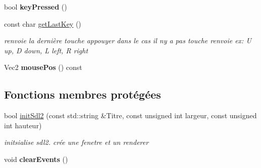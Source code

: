 \begin{DoxyCompactItemize}
\mbox{\label{class_fenetre_a2b8ce7464bca68921fa81a8feb81b536}} 
bool {\bfseries key\+Pressed} ()
\item 
\mbox{\label{class_fenetre_a201b7541c17b4915db1d4b6701b0d947}} 
const char \mbox{\hyperlink{class_fenetre_a201b7541c17b4915db1d4b6701b0d947}{get\+Last\+Key}} ()
\begin{DoxyCompactList}\small\item\em renvoie la dernière touche appouyer dans le cas il n\textquotesingle{}y a pas touche renvoie ex\+: U up, D down, L left, R right \end{DoxyCompactList}\item 
\mbox{\label{class_fenetre_a97779c8c1ff14f554ec9f39be1a6a7dd}} 
Vec2 {\bfseries mouse\+Pos} () const
\end{DoxyCompactItemize}
\subsection*{Fonctions membres protégées}
\begin{DoxyCompactItemize}
\item 
bool \mbox{\hyperlink{class_fenetre_a509d4b42356b63541d23532f79d65d7e}{init\+Sdl2}} (const std\+::string \&Titre, const unsigned int largeur, const unsigned int hauteur)
\begin{DoxyCompactList}\small\item\em initsialise sdl2. crée une fenetre et un renderer \end{DoxyCompactList}\item 
\mbox{\label{class_fenetre_a81c19f82177a6965c65636968c504f5a}} 
void {\bfseries clear\+Events} ()
\end{DoxyCompactItemize}
